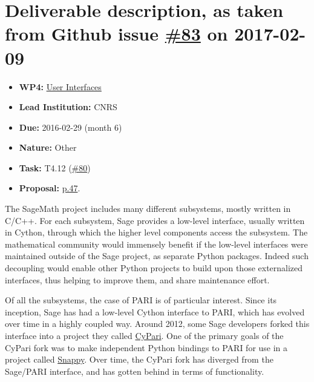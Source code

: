 \section*{\texorpdfstring{Deliverable description, as taken from Github
issue
\href{https://github.com/OpenDreamKit/OpenDreamKit/issues/83}{\#83} on
2017-02-09}{Deliverable description, as taken from Github issue \#83 on 2017-02-09}}\label{deliverable-description-as-taken-from-github-issue-83-on-2017-02-09}

\begin{itemize}
\tightlist
\item
  \textbf{WP4:}
  \href{https://github.com/OpenDreamKit/OpenDreamKit/tree/master/WP4}{User
  Interfaces}
\item
  \textbf{Lead Institution:} CNRS
\item
  \textbf{Due:} 2016-02-29 (month 6)
\item
  \textbf{Nature:} Other
\item
  \textbf{Task:} T4.12
  (\href{https://github.com/OpenDreamKit/OpenDreamKit/issues/80}{\#80})
\item
  \textbf{Proposal:}
  \href{https://github.com/OpenDreamKit/OpenDreamKit/raw/master/Proposal/proposal-www.pdf}{p.47}.
\end{itemize}

The SageMath project includes many different subsystems, mostly written
in C/C++. For each subsystem, Sage provides a low-level interface,
usually written in Cython, through which the higher level components
access the subsystem. The mathematical community would immensely benefit
if the low-level interfaces were maintained outside of the Sage project,
as separate Python packages. Indeed such decoupling would enable other
Python projects to build upon those externalized interfaces, thus
helping to improve them, and share maintenance effort.

Of all the subsystems, the case of PARI is of particular interest. Since
its inception, Sage has had a low-level Cython interface to PARI, which
has evolved over time in a highly coupled way. Around 2012, some Sage
developers forked this interface into a project they called
\href{https://bitbucket.org/t3m/cypari/}{CyPari}. One of the primary
goals of the CyPari fork was to make independent Python bindings to PARI
for use in a project called
\href{https://bitbucket.org/t3m/snappy}{Snappy}. Over time, the CyPari
fork has diverged from the Sage/PARI interface, and has gotten behind in
terms of functionality.


